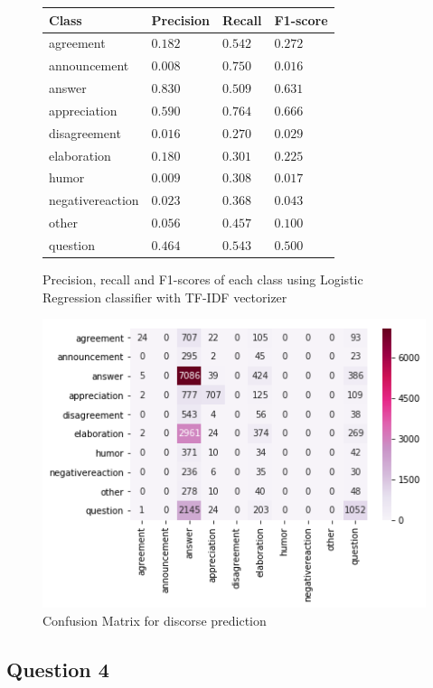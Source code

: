 \documentclass[10pt, a4paper]{article}
\begin{document}
\begin{figure}[H]
	\caption{Precision, recall and F1-scores of each class using Logistic Regression classifier with TF-IDF vectorizer}
	\begin{center}
		\begin{tabulary}{\textwidth}{|L|L|L|L|}
			\hline
			Class            & Precision & Recall    & F1-score \\
			\hline
			agreement        & \(0.182\) & \(0.542\) & \(0.272\) \\
			announcement     & \(0.008\) & \(0.750\) & \(0.016\) \\
			answer           & \(0.830\) & \(0.509\) & \(0.631\) \\
			appreciation     & \(0.590\) & \(0.764\) & \(0.666\) \\
			disagreement     & \(0.016\) & \(0.270\) & \(0.029\) \\
			elaboration      & \(0.180\) & \(0.301\) & \(0.225\) \\
			humor            & \(0.009\) & \(0.308\) & \(0.017\) \\
			negativereaction & \(0.023\) & \(0.368\) & \(0.043\) \\
			other            & \(0.056\) & \(0.457\) & \(0.100\) \\
			question         & \(0.464\) & \(0.543\) & \(0.500\) \\
			\hline
		\end{tabulary}
	\end{center}
\end{figure}

\begin{figure}[H]
	\caption{Confusion Matrix for discorse prediction}
	\begin{center}
		\includegraphics[width=.6\linewidth]{q3_mat}
	\end{center}
\end{figure}

\subsection{Question 4}
\end{document}
